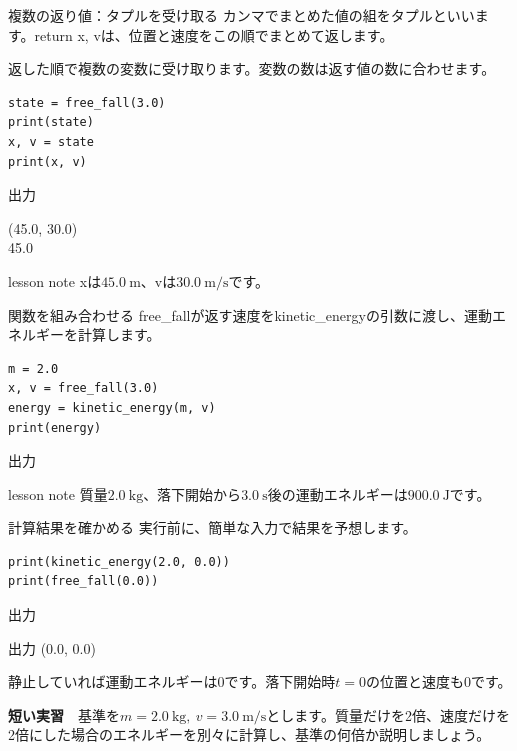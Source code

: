 \documentclass[12pt,aspectratio=43]{beamer}
\newcommand{\code}[1]{{\codefont #1}}
\newcommand{\result}[1]{%
  \par\vspace{1mm}%
  {\small\textcolor{black!60}{出力}}\quad
  {\codefont\fontsize{16}{18}\selectfont #1}\par}
\newenvironment{lessonbox}
  {\begin{beamercolorbox}[wd=\linewidth,sep=1.5mm]{lesson note}}
  {\end{beamercolorbox}\par}
\begin{document}
\begin{frame}[t,fragile]{複数の返り値：タプルを受け取る}
  \setlength{\parskip}{0pt}
  カンマでまとめた値の組をタプルといいます。\code{return x, v}は、位置と速度をこの順でまとめて返します。
  \par\vspace{1mm}
  返した順で複数の変数に受け取ります。変数の数は返す値の数に合わせます。
\begin{lstlisting}
state = free_fall(3.0)
print(state)
x, v = state
print(x, v)
\end{lstlisting}
  {\small\textcolor{black!60}{出力}}\quad
  {\codefont\fontsize{16}{18}\selectfont
    (45.0, 30.0)\\
    \hspace*{1cm}45.0\par}
  \begin{lessonbox}
    \small \code{x}は\(45.0\ \mathrm{m}\)、\code{v}は\(30.0\ \mathrm{m/s}\)です。
  \end{lessonbox}
\end{frame}

\begin{frame}[t,fragile]{関数を組み合わせる}
  \setlength{\parskip}{0pt}
  \code{free\_fall}が返す速度を\code{kinetic\_energy}の引数に渡し、運動エネルギーを計算します。
\begin{lstlisting}
m = 2.0
x, v = free_fall(3.0)
energy = kinetic_energy(m, v)
print(energy)
\end{lstlisting}
  \result{900.0}
  \begin{lessonbox}
    \small 質量\(2.0\ \mathrm{kg}\)、落下開始から\(3.0\ \mathrm{s}\)後の運動エネルギーは\(900.0\ \mathrm{J}\)です。
  \end{lessonbox}
\end{frame}

\begin{frame}[t,fragile]{計算結果を確かめる}
  \setlength{\parskip}{0pt}
  実行前に、簡単な入力で結果を予想します。
\begin{lstlisting}
print(kinetic_energy(2.0, 0.0))
print(free_fall(0.0))
\end{lstlisting}
  \result{0.0}
  \result{(0.0, 0.0)}
  \small 静止していれば運動エネルギーは0です。落下開始時\(t=0\)の位置と速度も0です。
  \par\vspace{2mm}
  \textbf{短い実習}　基準を\(m=2.0\ \mathrm{kg},\ v=3.0\ \mathrm{m/s}\)とします。質量だけを2倍、速度だけを2倍にした場合のエネルギーを別々に計算し、基準の何倍か説明しましょう。
\end{frame}
\end{document}
